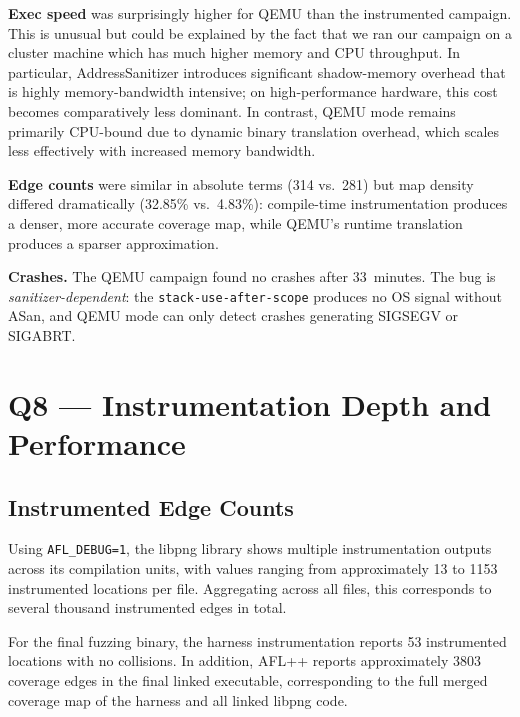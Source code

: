 \documentclass[letterpaper,twocolumn,10pt]{article}
\begin{document}
\textbf{Exec speed} was surprisingly higher for QEMU than the instrumented campaign. This is unusual but could be explained by the fact that we ran our campaign on a cluster machine which has much higher memory and CPU throughput. In particular, AddressSanitizer introduces significant shadow-memory overhead that is highly memory-bandwidth intensive; on high-performance hardware, this cost becomes comparatively less dominant. In contrast, QEMU mode remains primarily CPU-bound due to dynamic binary translation overhead, which scales less effectively with increased memory bandwidth.


\textbf{Edge counts} were similar in absolute terms (314 vs.\ 281) but map
density differed dramatically (32.85\% vs.\ 4.83\%): compile-time
instrumentation produces a denser, more accurate coverage map, while
QEMU's runtime translation produces a sparser approximation.
 
\textbf{Crashes.} The QEMU campaign found no crashes after 33~minutes.
The bug is \emph{sanitizer-dependent}:
the \texttt{stack-use-after-scope} produces no OS signal without
ASan, and QEMU mode can only detect crashes generating SIGSEGV or
SIGABRT.
















\section{Q8 --- Instrumentation Depth and Performance}
\label{sec:q8}
\subsection{Instrumented Edge Counts}
 
Using \texttt{AFL\_DEBUG=1}, the libpng library shows multiple
instrumentation outputs across its compilation units, with values
ranging from approximately 13 to 1153 instrumented locations per file.
Aggregating across all files, this corresponds to several thousand
instrumented edges in total.

For the final fuzzing binary, the harness instrumentation reports 53 instrumented locations with no collisions. In addition, AFL++ reports approximately 3803 coverage edges in the final linked executable, corresponding to the full merged coverage map of the harness and all linked libpng code.
\end{document}
